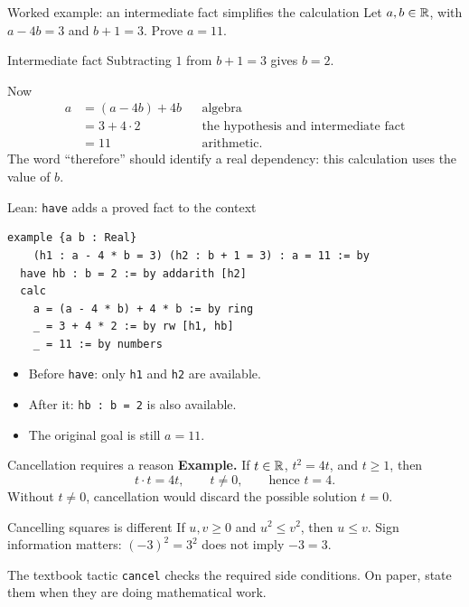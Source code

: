 \begin{frame}{Worked example: an intermediate fact simplifies the calculation}
Let $a,b\in\mathbb{R}$, with $a-4b=3$ and $b+1=3$. Prove $a=11$.
\begin{block}{Intermediate fact}
Subtracting $1$ from $b+1=3$ gives $b=2$.
\end{block}
Now
\[
\begin{aligned}
a&=(a-4b)+4b&&\text{algebra}\\
 &=3+4\cdot2&&\text{the hypothesis and intermediate fact}\\
 &=11&&\text{arithmetic}.
\end{aligned}
\]
The word ``therefore'' should identify a real dependency: this calculation uses the value of $b$.
\end{frame}

\begin{frame}[fragile]{Lean: \texttt{have} adds a proved fact to the context}
\begin{lstlisting}
example {a b : Real}
    (h1 : a - 4 * b = 3) (h2 : b + 1 = 3) : a = 11 := by
  have hb : b = 2 := by addarith [h2]
  calc
    a = (a - 4 * b) + 4 * b := by ring
    _ = 3 + 4 * 2 := by rw [h1, hb]
    _ = 11 := by numbers
\end{lstlisting}
\begin{itemize}
\item Before \texttt{have}: only \texttt{h1} and \texttt{h2} are available.
\item After it: \texttt{hb : b = 2} is also available.
\item The original goal is still $a=11$.
\end{itemize}
\end{frame}

\begin{frame}{Cancellation requires a reason}
\textbf{Example.} If $t\in\mathbb{R}$, $t^2=4t$, and $t\ge1$, then
\[
t\cdot t=4t,\qquad t\ne0,\qquad\text{hence }t=4.
\]
Without $t\ne0$, cancellation would discard the possible solution $t=0$.
\begin{block}{Cancelling squares is different}
If $u,v\ge0$ and $u^2\le v^2$, then $u\le v$.
Sign information matters: $(-3)^2=3^2$ does not imply $-3=3$.
\end{block}
The textbook tactic \texttt{cancel} checks the required side conditions.
On paper, state them when they are doing mathematical work.
\end{frame}

